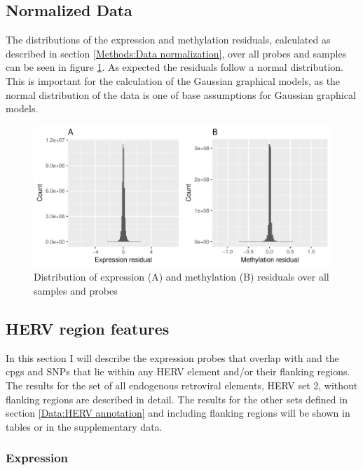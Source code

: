 \documentclass[a4paper,12pt,twoside,openright]{article}
\begin{document}
\subsection{Normalized Data}
\label{Results:Normalized Data}
The distributions of the expression and methylation residuals, calculated as described in section \ref{Methods:Data normalization}, over all probes and samples can be seen in figure \ref{fig:expr.meth.res.hist}. As expected the residuals follow a normal distribution. This is important for the calculation of the Gaussian graphical models, as the normal distribution of the data is one of base assumptions for Gaussian graphical models\cite{Mohammadi2015}.

\begin{figure}[b!]
	\includegraphics[scale=1, keepaspectratio = true]{../figures/expr_meth_res_hist}
	\caption{Distribution of expression (A) and methylation (B) residuals over all samples and probes}
	\label{fig:expr.meth.res.hist}
\end{figure}

\subsection{HERV region features}
\label{Results:HERV region features}
In this section I will describe the expression probes that overlap with and the cpgs and SNPs that lie within any HERV element and/or their flanking regions. The results for the set of all endogenous retroviral elements, HERV set 2, without flanking regions are described in detail. The results for the other sets defined in section \ref{Data:HERV annotation} and including flanking regions will be shown in tables or in the supplementary data.

\subsubsection{Expression}
\label{Results:Expression}
\end{document}

